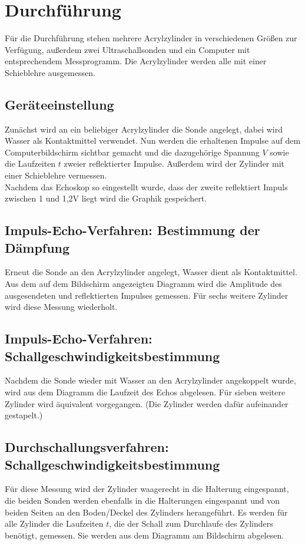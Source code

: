 \section{Durchführung}
\label{sec:Durchführung}

Für die Durchführung stehen mehrere Acrylzylinder in verschiedenen Größen zur
Verfügung, außerdem zwei Ultraschallsonden und ein Computer mit
entsprechendem Messprogramm. Die Acrylzylinder werden alle mit einer
Schieblehre ausgemessen.

\subsection{Geräteeinstellung}

Zunächst wird an ein beliebiger Acrylzylinder die Sonde angelegt, dabei
wird Wasser als Kontaktmittel verwendet. Nun werden die erhaltenen Impulse auf dem
Computerbildschirm sichtbar gemacht und die dazugehörige Spannung $V$ sowie
die Laufzeiten $t$ zweier reflektierter Impulse. Außerdem wird der Zylinder
mit einer Schieblehre vermessen.\\
Nachdem das Echoskop so eingestellt wurde, dass der zweite reflektiert Impuls
zwischen 1 und 1,2\;V liegt wird die Graphik gespeichert.


\subsection{Impuls-Echo-Verfahren: Bestimmung der Dämpfung}
Erneut die Sonde an den Acrylzylinder angelegt, Wasser dient als Kontaktmittel.
Aus dem auf dem Bildschirm angezeigten Diagramm wird die Amplitude
des ausgesendeten und reflektierten Impulses gemessen.
Für sechs weitere Zylinder wird diese Messung wiederholt.

\subsection{Impuls-Echo-Verfahren: Schallgeschwindigkeitsbestimmung}
Nachdem die Sonde wieder mit Wasser an den Acrylzylinder angekoppelt wurde, wird
aus dem Diagramm die Laufzeit des Echos abgelesen. Für sieben weitere
Zylinder wird äquivalent vorgegangen. (Die Zylinder werden dafür aufeinander gestapelt.)

\subsection{Durchschallungsverfahren: Schallgeschwindigkeitsbestimmung}
Für diese Messung wird der Zylinder waagerecht in die Halterung eingespannt, die
beiden Sonden werden ebenfalls in die Halterungen eingespannt und von beiden
Seiten an den Boden/Deckel des Zylinders herangeführt. Es werden für alle Zylinder
die Laufzeiten $t$, die der Schall zum Durchlaufe des Zylinders benötigt, gemessen.
Sie werden aus dem Diagramm am Bildschirm abgelesen.

